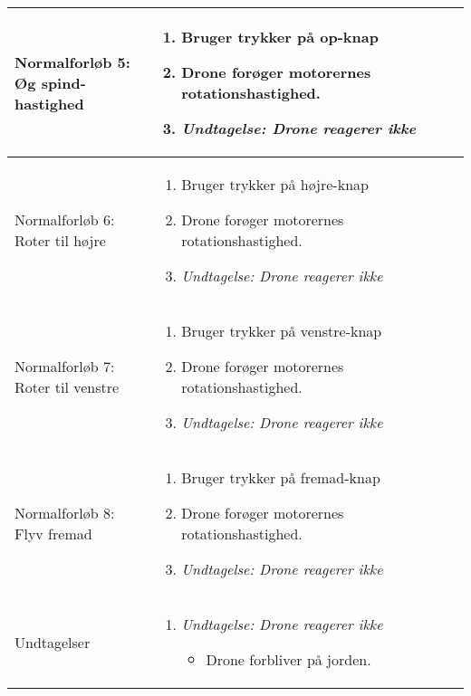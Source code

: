 \documentclass[Main]{subfiles}
\begin{document}
\begin{longtable}{|p{} p{}|}
\parbox[t]{0.25\textwidth}{Normalforløb 5: \\ Øg spind-hastighed} &	\vspace{-8mm}
	\begin{enumerate}[noitemsep,nolistsep,leftmargin=*]
	\item Bruger trykker på op-knap
	\item Drone forøger motorernes rotationshastighed.
	\item[] \textit{Undtagelse: Drone reagerer ikke}
	\end{enumerate} \\ \hline
	
\parbox[t]{0.25\textwidth}{Normalforløb 6: \\ Roter til højre} &	\vspace{-8mm}
	\begin{enumerate}[noitemsep,nolistsep,leftmargin=*]
	\item Bruger trykker på højre-knap
	\item Drone forøger motorernes rotationshastighed.
	\item[] \textit{Undtagelse: Drone reagerer ikke}
	\end{enumerate} \\ \hline
	
\parbox[t]{0.25\textwidth}{Normalforløb 7: \\ Roter til venstre} &	\vspace{-8mm}
	\begin{enumerate}[noitemsep,nolistsep,leftmargin=*]
	\item Bruger trykker på venstre-knap
	\item Drone forøger motorernes rotationshastighed.
	\item[] \textit{Undtagelse: Drone reagerer ikke}
	\end{enumerate} \\ \hline
	
\parbox[t]{0.25\textwidth}{Normalforløb 8: \\ Flyv fremad} &	\vspace{-8mm}
	\begin{enumerate}[noitemsep,nolistsep,leftmargin=*]
	\item Bruger trykker på fremad-knap
	\item Drone forøger motorernes rotationshastighed.
	\item[] \textit{Undtagelse: Drone reagerer ikke}
	\end{enumerate} \\ \hline

Undtagelser & \vspace{-8mm}
	\begin{enumerate}[noitemsep,nolistsep,leftmargin=*]
	\item[2.] \textit{Undtagelse: Drone reagerer ikke}
		\begin{itemize}
		\item Drone forbliver på jorden.
		\end{itemize}
	\end{enumerate} \\
\hline
\end{longtable}
\end{document}
